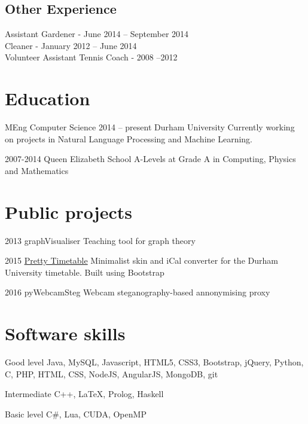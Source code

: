 \documentclass{tccv}
\begin{document}
\subsection{Other Experience}

Assistant Gardener - June 2014 -- September 2014 \\
Cleaner - January 2012 -- June 2014 \\
Volunteer Assistant Tennis Coach - 2008 --2012
\vfill\null
\columnbreak
\section{Education}

\begin{yearlist}

\item[MEng Computer Science]{2014 -- present}
     {Durham University}
     {Currently working on projects in Natural Language Processing and Machine Learning.
     }

\item{2007-2014}
     {Queen Elizabeth School}
     {A-Levels at Grade A in Computing, Physics and Mathematics}

\end{yearlist}

\section{Public projects}

\begin{yearlist}

\item{2013}
     {graphVisualiser}
     {Teaching tool for graph theory}

\item{2015}
     {\href{http://community.dur.ac.uk/g.t.hudson/durhamTimetableApp/}{Pretty Timetable}}
     {Minimalist skin and iCal converter for the Durham University timetable. Built using Bootstrap}

\item{2016}
     {pyWebcamSteg}
     {Webcam steganography-based annonymising proxy}
\end{yearlist}

\section{Software skills}

\begin{factlist}

\item{Good level}
     {Java, MySQL, Javascript, HTML5, CSS3, Bootstrap, jQuery, Python, C, PHP, HTML, CSS, NodeJS, AngularJS, MongoDB, git}

\item{Intermediate}
     {C++, \LaTeX, Prolog, Haskell}

\item{Basic level}
     {C\#, Lua, CUDA, OpenMP}

\end{factlist}
\end{document}
